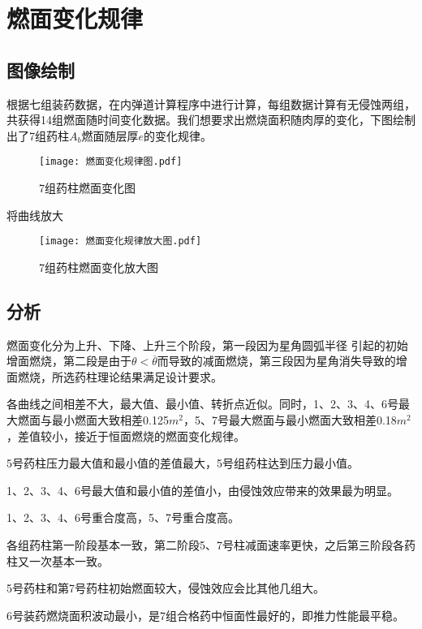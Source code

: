 
\chapter{燃面变化规律}
\section{图像绘制}

根据七组装药数据，在内弹道计算程序中进行计算，每组数据计算有无侵蚀两组，共获得14组燃面随时间变化数据。我们想要求出燃烧面积随肉厚的变化，下图绘制出了7组药柱$A_{b}$燃面随层厚$e$的变化规律。

\begin{figure}
  \centering
  \texttt{[image: 燃面变化规律图.pdf]}

  \caption{7组药柱燃面变化图}
  \label{fig:example}
\end{figure}

将曲线放大
\begin{figure}
    \centering
    \texttt{[image: 燃面变化规律放大图.pdf]}

    \caption{7组药柱燃面变化放大图}
    \label{fig:example}
  \end{figure}

\section{分析}
燃面变化分为上升、下降、上升三个阶段，第一段因为星角圆弧半径
引起的初始增面燃烧，第二段是由于$\theta < \overline{\theta }$而导致的减面燃烧，第三段因为星角消失导致的增面燃烧，所选药柱理论结果满足设计要求。

各曲线之间相差不大，最大值、最小值、转折点近似。同时，1、2、3、4、6号最大燃面与最小燃面大致相差0.125$m^2$，5、7号最大燃面与最小燃面大致相差0.18$m^2$，差值较小，接近于恒面燃烧的燃面变化规律。

5号药柱压力最大值和最小值的差值最大，5号组药柱达到压力最小值。

1、2、3、4、6号最大值和最小值的差值小，由侵蚀效应带来的效果最为明显。

1、2、3、4、6号重合度高，5、7号重合度高。

各组药柱第一阶段基本一致，第二阶段5、7号柱减面速率更快，之后第三阶段各药柱又一次基本一致。

5号药柱和第7号药柱初始燃面较大，侵蚀效应会比其他几组大。

6号装药燃烧面积波动最小，是7组合格药中恒面性最好的，即推力性能最平稳。